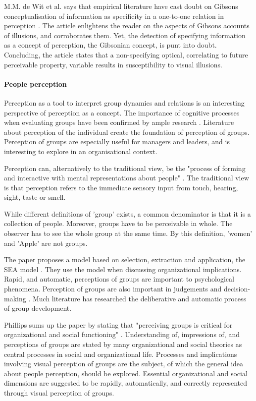 \documentclass[12pt, a4paper]{article}
\begin{document}
M.M. de Wit et al. says that empirical literature have cast doubt on Gibsons
conceptualisation of information as specificity in a one-to-one relation in
perception \cite{visualillusion}. The article enlightens the reader on the aspects of Gibsons accounts of
illusions, and corroborates them. Yet, the detection of specifying information
as a concept of perception, the Gibsonian concept, is punt into doubt. 
Concluding, the article states that a non-specifying optical, correlating to
future perceivable property, variable results
in susceptibility to visual illusions. 

\paragraph{People perception}
Perception as a tool to interpret group dynamics and relations is an interesting
perspective of perception as a concept. The importance of cognitive processes when
evaluating groups have been confirmed by ample research
\cite{peopleperception}. Literature about perception of the individual create
the foundation of perception of groups. Perception of groups are especially
useful for managers and leaders, and is interesting to explore in an
organisational context. 

Perception can, alternatively to the traditional view, be the "process of
forming and interactive with mental representations about people"
\cite{peopleperception}. The traditional view is that perception refers to the
immediate sensory input from touch, hearing, sight, taste or smell.

While different definitions of 'group' exists, a common denominator is that it
is a collection of people. Moreover, groups have to be perceivable in whole.
The observer has to see the whole group at the same time. By this definition,
'women' and 'Apple' are not groups. 

The paper proposes a model based on selection, extraction and application, the
SEA model \cite{peopleperception}. They use the model when discussing
organizational implications. Rapid, and automatic, perceptions of groups are
important to psychological phenomena. Perception of groups are also important
in judgements and decision-making \cite{peopleperception}. Much literature has
researched the deliberative and automatic process of group development.  

Phillips sums up the paper by stating that "perceiving groups is critical for
organizational and social functioning" \cite{peopleperception}. Understanding
of, impressions of, and perceptions of groups are stated by many organizational
and social theories as central processes in social and organizational life. 
Processes and implications involving visual perception of groups are the
subject, of which the general idea about people perception, should be explored. 
Essential organizational and social dimensions are suggested to be rapidly,
automatically, and correctly represented through visual perception of groups. 
\end{document}
